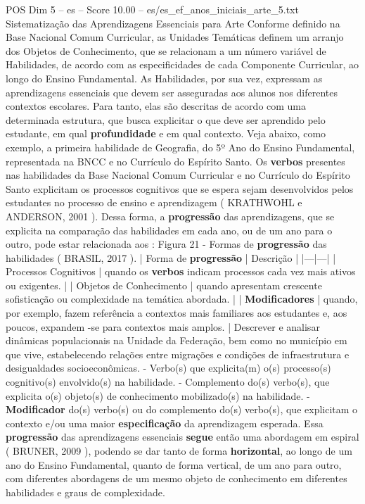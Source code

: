 \begin{textsample}{POS Dim 5 – es – Score 10.00 – es/es\_ef\_anos\_iniciais\_arte\_5.txt}  \label{ex:f5_pos_105}
Sistematização das Aprendizagens Essenciais para Arte Conforme definido na Base Nacional Comum Curricular, as Unidades Temáticas definem um arranjo dos Objetos de Conhecimento, que se relacionam a um número variável de Habilidades, de acordo com as especificidades de cada Componente Curricular, ao longo do Ensino Fundamental.
As Habilidades, por sua vez, expressam as aprendizagens essenciais que devem ser asseguradas aos alunos nos diferentes contextos escolares.
Para tanto, elas são descritas de acordo com uma determinada estrutura, que busca explicitar o que deve ser aprendido pelo estudante, em qual \textbf{profundidade} e em qual contexto.
Veja abaixo, como exemplo, a primeira habilidade de Geografia, do 5º Ano do Ensino Fundamental, representada na BNCC e no Currículo do Espírito Santo.
Os \textbf{verbos} presentes nas habilidades da Base Nacional Comum Curricular e no Currículo do Espírito Santo explicitam os processos cognitivos que se espera sejam desenvolvidos pelos estudantes no processo de ensino e aprendizagem ( KRATHWOHL e ANDERSON, 2001 ).
Dessa forma, a \textbf{progressão} das aprendizagens, que se explicita na comparação das habilidades em cada ano, ou de um ano para o outro, pode estar relacionada aos : Figura 21 - Formas de \textbf{progressão} das habilidades ( BRASIL, 2017 ). | Forma de \textbf{progressão} | Descrição | |---|---| | Processos Cognitivos | quando os \textbf{verbos} indicam processos cada vez mais ativos ou exigentes. | | Objetos de Conhecimento | quando apresentam crescente sofisticação ou complexidade na temática abordada. | | \textbf{Modificadores} | quando, por exemplo, fazem referência a contextos mais familiares aos estudantes e, aos poucos, expandem -se para contextos mais amplos. | Descrever e analisar dinâmicas populacionais na Unidade da Federação, bem como no município em que vive, estabelecendo relações entre migrações e condições de infraestrutura e desigualdades socioeconômicas. - Verbo(s) que explicita(m) o(s) processo(s) cognitivo(s) envolvido(s) na habilidade. - Complemento do(s) verbo(s), que explicita o(s) objeto(s) de conhecimento mobilizado(s) na habilidade. - \textbf{Modificador} do(s) verbo(s) ou do complemento do(s) verbo(s), que explicitam o contexto e/ou uma maior \textbf{especificação} da aprendizagem esperada.
Essa \textbf{progressão} das aprendizagens essenciais \textbf{segue} então uma abordagem em espiral ( BRUNER, 2009 ), podendo se dar tanto de forma \textbf{horizontal}, ao longo de um ano do Ensino Fundamental, quanto de forma vertical, de um ano para outro, com diferentes abordagens de um mesmo objeto de conhecimento em diferentes habilidades e graus de complexidade.

\end{textsample}

